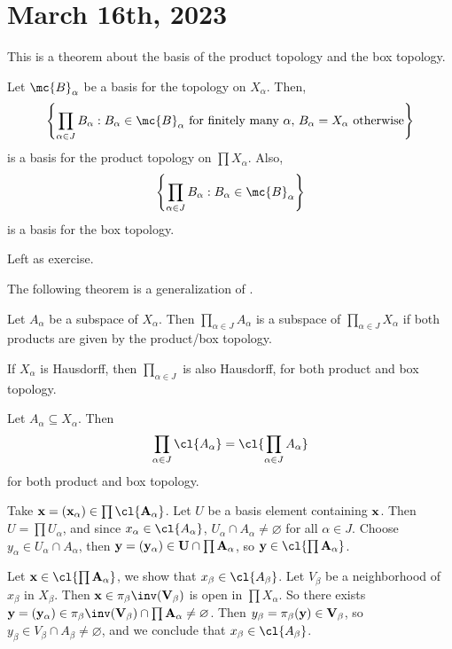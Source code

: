 \section*{March 16th, 2023}

This is a theorem about the basis of the product topology and the box topology.

 Let \(\mc{B}_\alpha\) be a basis for the topology on \(X_\alpha\). Then,
\[
    \left\{\prod_{\alpha \in J} B_\alpha : B_\alpha \in \mc{B}_\alpha \text{ for finitely many } \alpha,\, B_\alpha = X_\alpha \text{ otherwise}\right\}
\]
is a basis for the product topology on \(\prod X_\alpha\). Also,
\[
    \left\{\prod_{\alpha \in J} B_\alpha : B_\alpha \in \mc{B}_\alpha\right\}
\]
is a basis for the box topology.

\pf Left as exercise.

The following theorem is a generalization of .

 Let \(A_\alpha\) be a subspace of \(X_\alpha\). Then \(\prod_{\alpha \in J} A_\alpha\) is a subspace of \(\prod_{\alpha \in J} X_\alpha\) if both products are given by the product/box topology.

 If \(X_\alpha\) is Hausdorff, then \(\prod_{\alpha \in J}\) is also Hausdorff, for both product and box topology.

 Let \(A_\alpha \subseteq X_\alpha\). Then
\[
    \prod_{\alpha \in J} \cl{A_\alpha} = \cl{\prod_{\alpha \in J} A_\alpha}
\]
for both product and box topology.

\pf \note{\(\subseteq\)} Take \(\bf{x} = (x_\alpha) \in \prod \cl{A_\alpha}\). Let \(U\) be a basis element containing \(\bf{x}\). Then \(U = \prod U_\alpha\), and since \(x_\alpha \in \cl{A_\alpha}\), \(U_\alpha \cap A_\alpha \neq \varnothing\) for all \(\alpha \in J\). Choose \(y_\alpha \in U_\alpha \cap A_\alpha\), then \(\bf{y} = (y_\alpha) \in U\cap \prod A_\alpha\), so \(\bf{y} \in \cl{\prod A_\alpha}\).

\note{\(\supseteq\)} Let \(\bf{x} \in \cl{\prod A_\alpha}\), we show that \(x_\beta \in \cl{A_\beta}\). Let \(V_\beta\) be a neighborhood of \(x_\beta\) in \(X_\beta\). Then \(\bf{x} \in \pi_{\beta}\inv(V_\beta)\) is open in \(\prod X_\alpha\). So there exists \(\bf{y} = (y_\alpha) \in \pi_\beta\inv(V_\beta) \cap \prod A_\alpha \neq \varnothing\). Then \(y_\beta = \pi_\beta(\bf{y}) \in V_\beta\), so \(y_\beta \in V_\beta \cap A_\beta \neq \varnothing\), and we conclude that \(x_\beta \in \cl{A_\beta}\).

